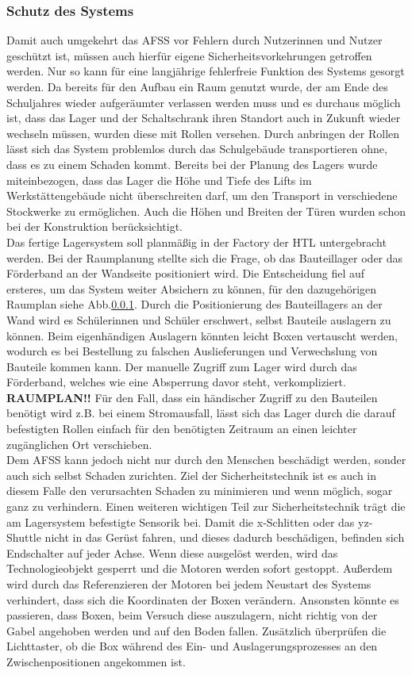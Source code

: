 \subsubsection{Schutz des Systems}
Damit auch umgekehrt das AFSS vor Fehlern durch Nutzerinnen und Nutzer geschützt ist, müssen auch hierfür eigene Sicherheitsvorkehrungen getroffen werden. Nur so kann für eine langjährige fehlerfreie Funktion des Systems gesorgt werden.
Da bereits für den Aufbau ein Raum genutzt wurde, der am Ende des Schuljahres wieder aufgeräumter verlassen werden muss und es durchaus möglich ist, dass das Lager und der Schaltschrank ihren Standort auch in Zukunft wieder wechseln müssen, wurden diese mit Rollen versehen. Durch anbringen der Rollen lässt sich das System problemlos durch das Schulgebäude transportieren ohne, dass es zu einem Schaden kommt. Bereits bei der Planung des Lagers wurde miteinbezogen, dass das Lager die Höhe und Tiefe des Lifts im Werkstättengebäude nicht überschreiten darf, um den Transport in verschiedene Stockwerke zu ermöglichen. Auch die Höhen und Breiten der Türen wurden schon bei der Konstruktion berücksichtigt.\\
Das fertige Lagersystem soll planmäßig in der Factory der HTL untergebracht werden. Bei der Raumplanung stellte sich die Frage, ob das Bauteillager oder das Förderband an der Wandseite positioniert wird. Die Entscheidung fiel auf ersteres, um das System weiter Absichern zu können, für den dazugehörigen Raumplan siehe Abb.\ref{}. Durch die Positionierung des Bauteillagers an der Wand wird es Schülerinnen und Schüler erschwert, selbst Bauteile auslagern zu können. Beim eigenhändigen Auslagern könnten leicht Boxen vertauscht werden, wodurch es bei Bestellung zu falschen Auslieferungen und Verwechslung von Bauteile kommen kann. Der manuelle Zugriff zum Lager wird durch das Förderband, welches wie eine Absperrung davor steht, verkompliziert.
\textbf{RAUMPLAN!!}
Für den Fall, dass ein händischer Zugriff zu den Bauteilen benötigt wird z.B. bei einem Stromausfall, lässt sich das Lager durch die darauf befestigten Rollen einfach für den benötigten Zeitraum an einen leichter zugänglichen Ort verschieben.\\
Dem AFSS kann jedoch nicht nur durch den Menschen beschädigt werden, sonder auch sich selbst Schaden zurichten. Ziel der Sicherheitstechnik ist es auch in diesem Falle den verursachten Schaden zu minimieren und wenn möglich, sogar ganz zu verhindern. Einen weiteren wichtigen Teil zur Sicherheitstechnik trägt die am Lagersystem befestigte Sensorik bei. Damit die x-Schlitten oder das yz-Shuttle nicht in das Gerüst fahren, und dieses dadurch beschädigen, befinden sich Endschalter auf jeder Achse. Wenn diese ausgelöst werden, wird das Technologieobjekt gesperrt und die Motoren werden sofort gestoppt. Außerdem wird durch das Referenzieren der Motoren bei jedem Neustart des Systems verhindert, dass sich die Koordinaten der Boxen verändern. Ansonsten könnte es passieren, dass Boxen, beim Versuch diese auszulagern, nicht richtig von der Gabel angehoben werden und auf den Boden fallen. Zusätzlich überprüfen die Lichttaster, ob die Box während des Ein- und Auslagerungsprozesses an den Zwischenpositionen angekommen ist.\\
